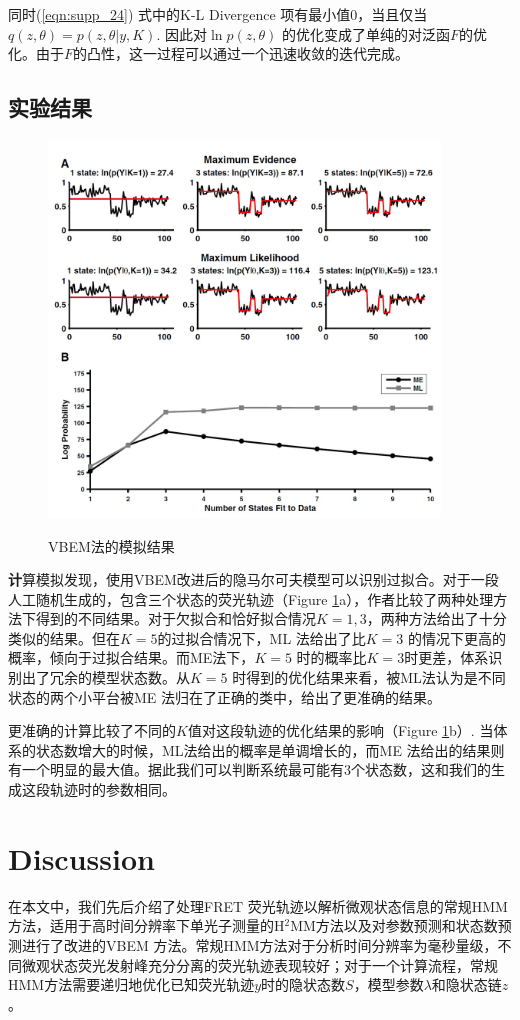 \documentclass[11pt, a4paper]{article}
\begin{document}
    同时(\ref{eqn:supp_24}) 式中的K-L Divergence 项有最小值0，当且仅当$q(z,\theta)=p(z,\theta|y,K)$. 因此对$\ln p(z,\theta)$ 的优化变成了单纯的对泛函$F$的优化。由于$F$的凸性，这一过程可以通过一个迅速收敛的迭代完成。

    \subsection{实验结果}
    \begin{figure}[htb]
      \centering
      \includegraphics[height=10cm]{fig_vbms.jpg}\\
      \caption{VBEM法的模拟结果}
      \label{fig:vbem}
    \end{figure}

    \textbf{计}算模拟发现，使用VBEM改进后的隐马尔可夫模型可以识别过拟合。对于一段人工随机生成的，包含三个状态的荧光轨迹（Figure \ref{fig:vbem}a），作者比较了两种处理方法下得到的不同结果。对于欠拟合和恰好拟合情况$K=1, 3$，两种方法给出了十分类似的结果。但在$K=5$的过拟合情况下，ML 法给出了比$K=3$ 的情况下更高的概率，倾向于过拟合结果。而ME法下，$K=5$ 时的概率比$K=3$时更差，体系识别出了冗余的模型状态数。从$K=5$ 时得到的优化结果来看，被ML法认为是不同状态的两个小平台被ME 法归在了正确的类中，给出了更准确的结果。

    更准确的计算比较了不同的$K$值对这段轨迹的优化结果的影响（Figure \ref{fig:vbem}b）. 当体系的状态数增大的时候，ML法给出的概率是单调增长的，而ME 法给出的结果则有一个明显的最大值。据此我们可以判断系统最可能有3个状态数，这和我们的生成这段轨迹时的参数相同。


\section{Discussion}\label{chapter:Discussion}
在本文中，我们先后介绍了处理FRET 荧光轨迹以解析微观状态信息的常规HMM方法，适用于高时间分辨率下单光子测量的H$^2$MM方法以及对参数预测和状态数预测进行了改进的VBEM 方法。常规HMM方法对于分析时间分辨率为毫秒量级，不同微观状态荧光发射峰充分分离的荧光轨迹表现较好；对于一个计算流程，常规HMM方法需要递归地优化已知荧光轨迹$y$时的隐状态数$S$，模型参数$\lambda$和隐状态链$z$。
\end{document}
